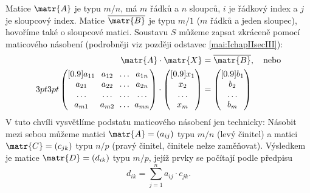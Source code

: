       Matice \(\matr{A}\) je typu \(m/n\), má \(m\) řádků a \(n\) sloupců, \(i\) je řádkový index a
      \(j\) je sloupcový index. Matice \(\overline{\matr{B}}\) je typu \(m/1\) (\(m\) řádků a jeden
      sloupec), hovoříme také o sloupcové matici. Soustavu \(S\) můžeme zapsat zkráceně pomocí
      maticového násobení (podrobněji viz později odstavec \ref{mai:IchapIIsecIII}):
      \begin{align}\label{mai:eq004}
        \matr{A} \cdot \matr{X} &= \overline{\matr{B}}, \quad \text{nebo} \nonumber\\
        \setlength{\arraycolsep}{3pt}
          \begin{pmatrix}[0.9]
            a_{11} & a_{12} & \ldots & a_{1n} \\
            a_{21} & a_{22} & \ldots & a_{2n} \\
            \ldots & \ldots & \ldots & \ldots \\
            a_{m1} & a_{m2} & \ldots & a_{mn}
          \end{pmatrix} \cdot
          \begin{pmatrix}[0.9]
            x_1     \\
            x_2     \\
            \ldots  \\
            x_m 
          \end{pmatrix}  &=
          \begin{pmatrix}[0.9]
            b_1     \\
            b_2     \\
            \ldots  \\
            b_m 
          \end{pmatrix}
      \end{align} 
      V tuto chvíli vysvětlíme podstatu maticového násobení jen technicky: Násobit mezi sebou
      můžeme matici \(\matr{A} = (a_{ij})\) typu \(m/n\) (levý činitel) a matici \(\matr{C} =
      (c_{jk})\) typu \(n/p\) (pravý činitel, činitele nelze zaměňovat). Výsledkem je matice
      \(\matr{D} = (d_{ik})\) typu \(m/p\), jejíž prvky se počítají podle předpisu
      \begin{equation}\label{mai:eq005}
        d_{ik} = \sum_{j=1}^{n} a_{ij}\cdot c_{jk}.
      \end{equation}
      
